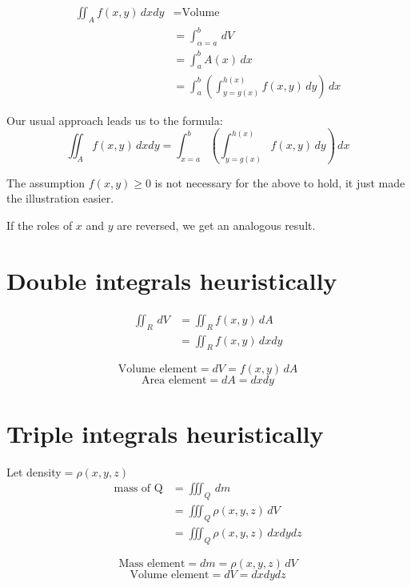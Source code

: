 \documentclass[11pt]{article}
\begin{document}
\begin{align*}
\iint_A f(x, y) \, dx dy &= \text{Volume} \\
&= \int_{\alpha = a}^b \, dV \\
&= \int_a^b A(x) \, dx \\
&= \int_a^b \left( \int_{y = g(x)}^{h(x)} f(x, y) \, dy \right) \, dx
\end{align*}

Our usual approach leads us to the formula:
\[\iint_A f(x, y) \, dx dy = \int_{x = a}^b \left( \int_{y = g(x)}^{h(x)} f(x, y) \, dy \right) \, dx\]

The assumption \(f(x, y) \ge 0\) is not necessary for the above to hold, it just made the illustration easier.


If the roles of \(x\) and \(y\) are reversed, we get an analogous result.

\newpage
\section{Double integrals heuristically}
\label{sec:orgdc5f6af}
\begin{align*}
\iint_R \, dV &= \iint_R f(x, y) \, dA \\
&= \iint_R f(x, y) \, dx dy
\end{align*}

\[\text{Volume element} = dV = f(x, y) \, dA\]
\[\text{Area element} = dA = dx dy\]
\section{Triple integrals heuristically}
\label{sec:org87f3265}
Let density\(= \rho (x, y, z)\)
\begin{align*}
\text{mass of Q} &= \iiint_Q \, dm \\
&= \iiint_Q \rho (x, y, z) \, dV \\
&= \iiint_Q \rho (x, y, z) \, dx dy dz
\end{align*}

\[\text{Mass element} = dm = \rho (x, y, z) \, dV\]
\[\text{Volume element} = dV = dx dy dz\]
\end{document}
